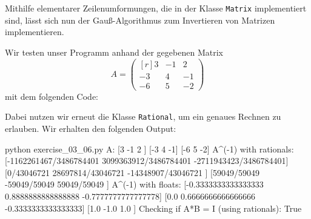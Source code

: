 \section{}

Mithilfe elementarer Zeilenumformungen, die in der Klasse \texttt{Matrix} implementiert sind, lässt sich nun der Gauß-Algorithmus zum Invertieren von Matrizen implementieren.



Wir testen unser Programm anhand der gegebenen Matrix
\[
  A
  = \begin{pmatrix*}[r]
       3  & -1  &  2  \\
      -3  &  4  & -1  \\
      -6  &  5  & -2
    \end{pmatrix*}
\]
mit dem folgenden Code:



Dabei nutzen wir erneut die Klasse \texttt{Rational}, um ein genaues Rechnen zu erlauben.
Wir erhalten den folgenden Output:

\begin{consoleoutput}
python exercise_03_06.py
A:
[3  -1 2 ]
[-3 4  -1]
[-6 5  -2]
A^(-1) with rationals:
[-1162261467/3486784401 3099363912/3486784401 -2711943423/3486784401]
[0/43046721             28697814/43046721     -14348907/43046721    ]
[59049/59049            -59049/59049          59049/59049           ]
A^(-1) with floats:
[-0.3333333333333333 0.8888888888888888 -0.7777777777777778]
[0.0                 0.6666666666666666 -0.3333333333333333]
[1.0                 -1.0               1.0                ]
Checking if A*B = I (using rationals):
True
\end{consoleoutput}
